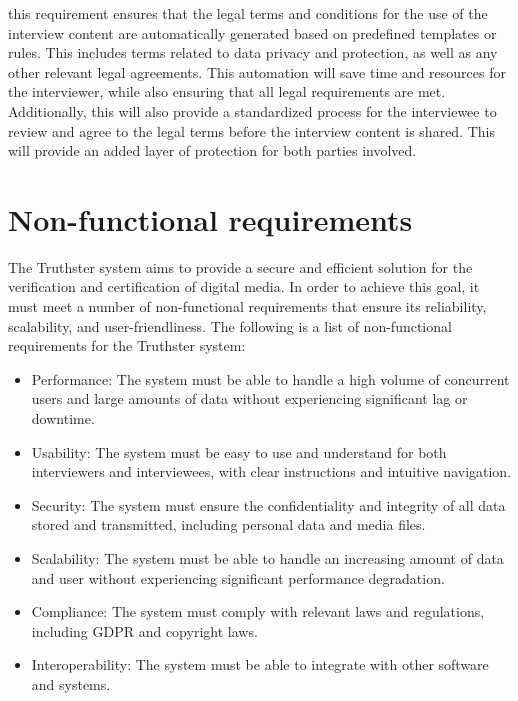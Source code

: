 \documentclass[target=mst,aauheader=]{thud}
\begin{document}
\begin{itemize}
    this requirement ensures that the legal terms and conditions for the use of the interview content are automatically generated based on predefined templates or rules. This includes terms related to data privacy and protection, as well as any other relevant legal agreements. This automation will save time and resources for the interviewer, while also ensuring that all legal requirements are met. Additionally, this will also provide a standardized process for the interviewee to review and agree to the legal terms before the interview content is shared. This will provide an added layer of protection for both parties involved.

\end{itemize}

\section{Non-functional requirements}

The Truthster system aims to provide a secure and efficient solution for the verification and certification of digital media. In order to achieve this goal, it must meet a number of non-functional requirements that ensure its reliability, scalability, and user-friendliness. The following is a list of non-functional requirements for the Truthster system:\\

\begin{itemize}

    \item Performance: The system must be able to handle a high volume of concurrent users and large amounts of data without experiencing significant lag or downtime.
    \item Usability: The system must be easy to use and understand for both interviewers and interviewees, with clear instructions and intuitive navigation.
    \item Security: The system must ensure the confidentiality and integrity of all data stored and transmitted, including personal data and media files.
    \item Scalability: The system must be able to handle an increasing amount of data and user without experiencing significant performance degradation.
    \item Compliance: The system must comply with relevant laws and regulations, including GDPR and copyright laws.
    \item Interoperability: The system must be able to integrate with other software and systems.

\end{itemize}
\end{document}

